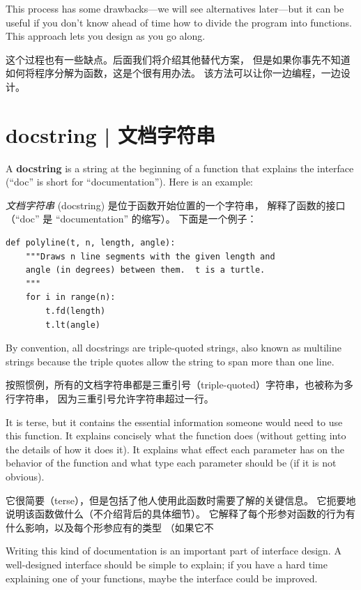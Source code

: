 This process has some drawbacks---we will see alternatives later---but
it can be useful if you don't know ahead of time how to divide the
program into functions.  This approach lets you design as you go
along.

这个过程也有一些缺点。后面我们将介绍其他替代方案，
但是如果你事先不知道如何将程序分解为函数，这是个很有用办法。
该方法可以让你一边编程，一边设计。


\section{docstring  |  文档字符串}
\label{docstring}

A {\bf docstring} is a string at the beginning of a function that
explains the interface (``doc'' is short for ``documentation'').  Here
is an example:

\emph{文档字符串} (docstring) 是位于函数开始位置的一个字符串，
解释了函数的接口（``doc'' 是 ``documentation'' 的缩写）。 下面是一个例子：

\begin{lstlisting}
def polyline(t, n, length, angle):
    """Draws n line segments with the given length and
    angle (in degrees) between them.  t is a turtle.
    """
    for i in range(n):
        t.fd(length)
        t.lt(angle)
\end{lstlisting}

%
By convention, all docstrings are triple-quoted strings, also known
as multiline strings because the triple quotes allow the string
to span more than one line.

按照惯例，所有的文档字符串都是三重引号（triple-quoted）字符串，也被称为多行字符串，
因为三重引号允许字符串超过一行。
  
  

It is terse, but it contains the essential information
someone would need to use this function.  It explains concisely what
the function does (without getting into the details of how it does
it).  It explains what effect each parameter has on the behavior of
the function and what type each parameter should be (if it is not
obvious).

它很简要（terse），但是包括了他人使用此函数时需要了解的关键信息。
它扼要地说明该函数做什么（不介绍背后的具体细节）。
它解释了每个形参对函数的行为有什么影响，以及每个形参应有的类型
（如果它不

Writing this kind of documentation is an important part of interface
design.  A well-designed interface should be simple to explain;
if you have a hard time explaining one of your functions,
maybe the interface could be improved.


